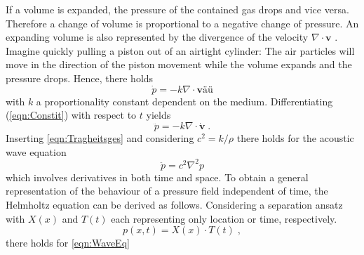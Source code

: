 \documentclass[%
  a4paper,oneside,%
  11pt,%
  smallchapters,
  style=printdev,
  extramargin,
  green,%
  rgb, <cmyk>
  ]{tubsbook}
\begin{document}
If a volume is expanded, the pressure of the contained gas drops and vice versa. Therefore a change of volume is proportional to a negative change of pressure. An expanding volume is also represented by the divergence of the velocity $\nabla \cdot \bm{v}$ \cite[p. 134 ff.]{larson2013}.  Imagine quickly pulling a piston out of an airtight cylinder: The air particles will move in the direction of the piston movement while the volume expands and the pressure drops. Hence, there holds
\begin{equation}
\dot{p} = -k \nabla \cdot \bm{v}äü
\label{eqn:Constit}
\end{equation}
with $k$ a proportionality constant dependent on the medium.
Differentiating (\ref{eqn:Constit}) with respect to $t$ yields 
\begin{equation}
\ddot{p} = -k \nabla \cdot \dot{\bm{v}} \;.
\end{equation}
Inserting \eqref{eqn:Tragheitsges} and considering $c^2 = k/\rho$ there holds for the acoustic wave equation
\begin{equation}
\ddot{p} = c^2 \nabla^2 p 
\label{eqn:WaveEq}
\end{equation}
which involves derivatives in both time and space. To obtain a general representation of the behaviour of a pressure field independent of time, the Helmholtz equation can be derived as follows.
Considering a separation ansatz \cite[p.659]{westermann2015} with $X(x)$ and $T(t)$ each representing only location or time, respectively.
\begin{equation}
p(x,t) = X(x) \cdot T(t) \; ,
\end{equation}
there holds for \eqref{eqn:WaveEq}
\end{document}
